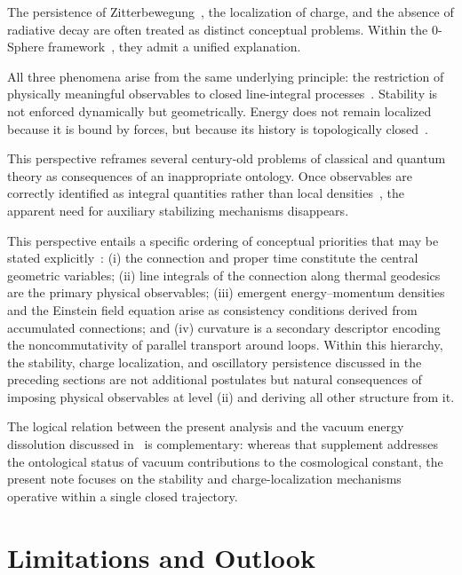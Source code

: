 \documentclass[12pt,a4paper]{article}
\begin{document}
\justifying

The persistence of Zitterbewegung~\cite{schrodinger1930,hanamura18356895}, the localization of charge, and the absence of radiative decay are often treated as distinct conceptual problems. Within the 0-Sphere framework~\cite{hanamura16759284}, they admit a unified explanation.

All three phenomena arise from the same underlying principle: the restriction of physically meaningful observables to closed line-integral processes~\cite{aharonov1959,berry1984,hanamura17765409,hanamura18275142,hanamura18203433}. Stability is not enforced dynamically but geometrically. Energy does not remain localized because it is bound by forces, but because its history is topologically closed~\cite{hanamura18275142}.

This perspective reframes several century-old problems of classical and quantum theory as consequences of an inappropriate ontology. Once observables are correctly identified as integral quantities rather than local densities~\cite{hanamura18067760,hanamura18135855,hanamura18203433}, the apparent need for auxiliary stabilizing mechanisms disappears.

This perspective entails a specific ordering of conceptual priorities that may be stated explicitly~\cite{hanamura18203433}: (i) the connection and proper time constitute the central geometric variables; (ii) line integrals of the connection along thermal geodesics are the primary physical observables; (iii) emergent energy--momentum densities and the Einstein field equation arise as consistency conditions derived from accumulated connections; and (iv) curvature is a secondary descriptor encoding the noncommutativity of parallel transport around loops. Within this hierarchy, the stability, charge localization, and oscillatory persistence discussed in the preceding sections are not additional postulates but natural consequences of imposing physical observables at level (ii) and deriving all other structure from it.

The logical relation between the present analysis and the vacuum energy dissolution discussed in~\cite{hanamura18727981} is complementary: whereas that supplement addresses the ontological status of vacuum contributions to the cosmological constant, the present note focuses on the stability and charge-localization mechanisms operative within a single closed trajectory.

\section{Limitations and Outlook}
\label{sec:limitations}
\end{document}
